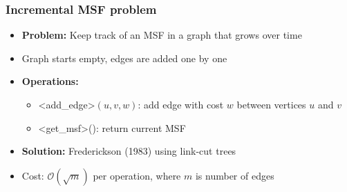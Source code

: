 \documentclass[fleqn]{beamer}
\newcommand{\Oh}{\mathcal{O}}
\def\texttt#1{<#1>}%
\begin{document}
\begin{frame}
    \frametitle{Incremental MSF problem}
    
    \begin{itemize}
    \item \textbf{Problem:} Keep track of an MSF in a graph that grows over time \vfill
    \item Graph starts empty, edges are added one by one \vfill\pause
    \item \textbf{Operations:}
        \begin{itemize}
        \item \texttt{add\_edge}$(u,v,w)$: add edge with cost $w$ between vertices $u$ and $v$
        \item \texttt{get\_msf}(): return current MSF
        \end{itemize} \vfill\pause
    \item \textbf{Solution:} Frederickson (1983) using link-cut trees \vfill
    \item Cost: $\Oh(\sqrt{m})$ per operation, where $m$ is number of edges \vfill
    \end{itemize}
\end{frame}
\end{document}
